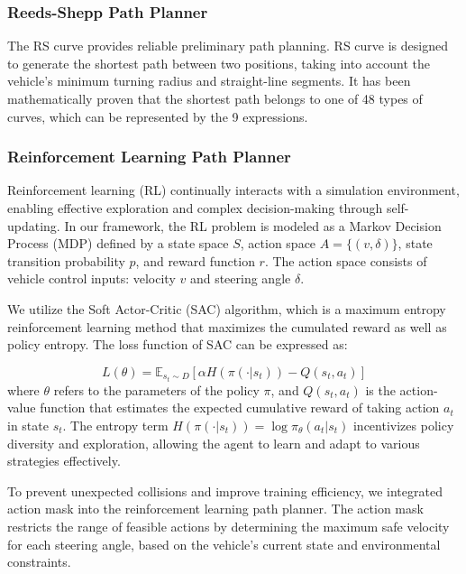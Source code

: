 \documentclass[ conference]{./support/ieeeconf}
\begin{document}
\subsubsection{Reeds-Shepp Path Planner}
The RS curve\cite{RS_curve1990} provides reliable preliminary path planning. 
RS curve is designed to generate the shortest path between two positions, taking into account the vehicle’s minimum turning radius and straight-line segments. 
It has been mathematically proven that the shortest path belongs to one of 48 types of curves, which can be represented by the 9 expressions.



\subsubsection{Reinforcement Learning Path Planner}
Reinforcement learning (RL) continually interacts with a simulation environment, enabling effective exploration and complex decision-making through self-updating. 
In our framework, the RL problem is modeled as a Markov Decision Process (MDP) defined by a state space $S$, action space $A = \{(v, \delta)\}$, state transition probability $p$, and reward function $r$. 
The action space consists of vehicle control inputs: velocity $v$ and steering angle $\delta$.

We utilize the Soft Actor-Critic (SAC)\cite{SAC2018} algorithm, which is a maximum entropy reinforcement learning method that maximizes the cumulated reward as well as policy entropy. The loss function of SAC can be expressed as:

\begin{equation}
    L(\theta) = \mathbb{E}_{s_t \sim D} [\alpha H(\pi(\cdot | s_t)) - Q(s_t, a_t)]
\end{equation}
where $\theta$ refers to the parameters of the policy $\pi$, and $Q(s_t, a_t)$ is the action-value function that estimates the expected cumulative reward of taking action $a_t$ in state $s_t$. The entropy term $H(\pi(\cdot | s_t)) = \log \pi_{\theta}(a_t | s_t)$ incentivizes policy diversity and exploration, allowing the agent to learn and adapt to various strategies effectively.

To prevent unexpected collisions and improve training efficiency, we integrated action mask into the reinforcement learning path planner. 
The action mask restricts the range of feasible actions by determining the maximum safe velocity for each steering angle, based on the vehicle's current state and environmental constraints. 
\end{document}
